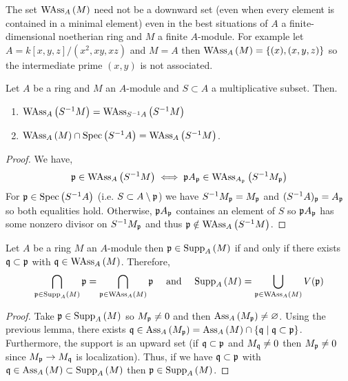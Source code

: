 \documentclass[12pt]{article}
\begin{document}
\begin{rmk}
The set $\WAss{A}{M}$ need not be a downward set (even when every element is contained in a minimal element) even in the best situations of $A$ a finite-dimensional noetherian ring and $M$ a finite $A$-module. For example let $A = k[x,y,z] / (x^2, xy, xz)$ and $M = A$ then $\WAss{A}{M} = \{ (x), (x,y,z) \}$ so the intermediate prime $(x,y)$ is not associated. 
\end{rmk}

\begin{lemma} \label{ass_primes_localization}
Let $A$ be a ring and $M$ an $A$-module and $S \subset A$ a multiplicative subset. Then.
\begin{enumerate}
\item $\WAss{A}{S^{-1} M} = \WAss{S^{-1} A}{S^{-1} M}$ 
\item $\WAss{A}{M} \cap \Spec{S^{-1} A} = \WAss{A}{S^{-1} M}$.
\end{enumerate}
\end{lemma}

\begin{proof}
We have,
\[ \p \in \WAss{A}{S^{-1} M} \iff \p A_\p \in \WAss{A_\p}{S^{-1} M_\p}  \]
For $\p \in \Spec{S^{-1} A}$ (i.e. $S \subset A \setminus \p$) we have $S^{-1} M_\p = M_\p$ and $(S^{-1} A)_\p = A_\p$ so both equalities hold. Otherwise, $\p A_\p$ containes an element of $S$ so $\p A_\p$ has some nonzero divisor on $S^{-1} M_\p$ and thus $\p \notin \WAss{A}{S^{-1} M}$. 
\end{proof}


\begin{proposition}
Let $A$ be a ring $M$ an $A$-module then $\p \in \Supp{A}{M}$ if and only if there exists $\q \subset \p$ with $\q \in \WAss{A}{M}$. Therefore, \[ \bigcap_{\p \in \Supp{A}{M}} \p = \bigcap_{\p \in \WAss{A}{M}} \p \quad \text{ and } \quad \Supp{A}{M} = \bigcup_{\p \in \WAss{A}{M}} V(\p) \]
\end{proposition}

\begin{proof}
Take $\p \in \Supp{A}{M}$ so $M_\p \neq 0$ and then $\Ass{A}{M_\p} \neq \varnothing$. Using the previous lemma, there exists $\q \in \Ass{A}{M_\p} = \Ass{A}{M} \cap \{ \q \mid \q \subset \p \}$. Furthermore, the support is an upward set (if $\q \subset \p$ and $M_\q \neq 0$ then $M_\p \neq 0$ since $M_\p \to M_\q$ is localization). Thus, if we have $\q \subset \p$ with $\q \in \Ass{A}{M} \subset \Supp{A}{M}$ then $\p \in \Supp{A}{M}$.  
\end{proof}
\end{document}

